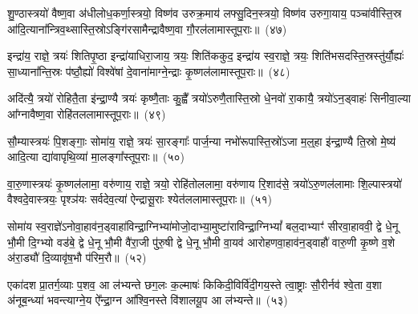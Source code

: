 {\anuvakamend[{क॒र्णास्त्रयो॑विꣳशतिः}]}%

शु॒ण्ठास्त्रयो॑ वैष्ण॒वा अ॑धीलोध॒कर्णा॒स्त्रयो॒ विष्ण॑व उरुक्र॒माय॑ लफ्सु॒दिन॒स्त्रयो॒ विष्ण॑व उरुगा॒याय॒ पञ्चा॑वीस्ति॒स्र आ॑दि॒त्याना᳚न्त्रिव॒थ्सास्ति॒स्रो\-ऽङ्गि॑रसामैन्द्रावैष्ण॒वा गौ॒रल॑लामास्तूप॒राः॥~(४७)

{\anuvakamend[{शु॒ण्ठा विꣳ॑श॒तिः}]}%

इन्द्रा॑य॒ राज्ञे॒ त्रयः॑ शितिपृ॒ष्ठा इन्द्रा॑याधिरा॒जाय॒ त्रयः॒ शिति॑ककुद॒ इन्द्रा॑य स्व॒राज्ञे॒ त्रयः॒ शिति॑भसदस्ति॒स्रस्तु॑र्यौ॒ह्यः॑ सा॒ध्याना᳚न्ति॒स्रः प॑ष्ठौ॒ह्यो॑ विश्वे॑षां दे॒वाना॑माग्ने॒न्द्राः कृ॒ष्णल॑लामास्तूप॒राः॥~(४८)

{\anuvakamend[{इन्द्रा॑य॒ राज्ञे॒ द्वाविꣳ॑शतिः}]}%

अदि॑त्यै॒ त्रयो॑ रोहितै॒ता इ॑न्द्रा॒ण्यै त्रयः॑ कृष्णै॒ताः कु॒ह्वै᳚ त्रयो॑\-ऽरुणै॒तास्ति॒स्रो धे॒नवो॑ रा॒कायै॒ त्रयो॑\-ऽन॒ड्वाहः॑ सिनीवा॒ल्या आ᳚ग्नावैष्ण॒वा रोहि॑तललामास्तूप॒राः॥~(४९)

{\anuvakamend[{अदि॑त्या अ॒ष्टाद॑श}]}%

सौ॒म्यास्त्रयः॑ पि॒शङ्गाः॒ सोमा॑य॒ राज्ञे॒ त्रयः॑ सा॒रङ्गाः᳚ पार्ज॒न्या नभो॑रूपास्ति॒स्रो॑\-ऽजा म॒ल्॒\mbox{}हा इ॑न्द्रा॒ण्यै ति॒स्रो मे॒ष्य॑ आदि॒त्या द्या॑वापृथि॒व्या॑ मा॒लङ्गा᳚स्तूप॒राः॥~(५०)

{\anuvakamend[{सौ॒म्या एका॒न्नविꣳ॑शतिः}]}%

वा॒रु॒णास्त्रयः॑ कृ॒ष्णल॑लामा॒ वरु॑णाय॒ राज्ञे॒ त्रयो॒ रोहि॑तोललामा॒ वरु॑णाय रि॒शाद॑से॒ त्रयो॑\-ऽरु॒णल॑लामाः शि॒ल्पास्त्रयो॑ वैश्वदे॒वास्त्रयः॒ पृश्ञ॑यः सर्वदेव॒त्या॑ ऐन्द्रासू॒राः श्येत॑ललामास्तूप॒राः॥~(५१)

{\anuvakamend[{वा॒रु॒णा विꣳ॑श॒तिः}]}%

सोमा॑य स्व॒राज्ञे॑\-ऽनोवा॒हाव॑न॒ड्वाहा॑विन्द्रा॒ग्निभ्या॑मोजो॒दाभ्या॒मुष्टा॑राविन्द्रा॒ग्नि\-भ्यां᳚ बल॒दाभ्याꣳ॑ सीरवा॒हाववी॒ द्वे धे॒नू भौ॒मी दि॒ग्भ्यो वड॑बे॒ द्वे धे॒नू भौ॒मी वै॑रा॒जी पु॑रु॒षी द्वे धे॒नू भौ॒मी वा॒यव॑ आरोहणवा॒हाव॑न॒ड्वाहौ॑ वारु॒णी कृ॒ष्णे व॒शे अ॑रा॒ड्यौ॑ दि॒व्यावृ॑ष॒भौ प॑रिम॒रौ॥~(५२)

{\anuvakamend[{सोमा॑य स्व॒राज्ञे॒ चतु॑स्त्रिꣳशत्}]}%

एका॑\-दश प्रा॒तर्ग॒व्याः प॒शव॒ आ ल॑भ्यन्ते छग॒लः क॒ल्माषः॑ किकिदी॒विर्वि॑दी॒गय॒स्ते त्वा॒ष्ट्राः सौ॒रीर्नव॑ श्वे॒ता व॒शा अ॑नूब॒न्ध्या॑ भवन्त्याग्ने॒य ऐ᳚न्द्रा॒ग्न आ᳚श्वि॒नस्ते वि॑शालयू॒प आ ल॑भ्यन्ते॥~(५३)

{\anuvakamend[{एका॑\-दश॒ पञ्च॑विꣳशतिः}]}%

